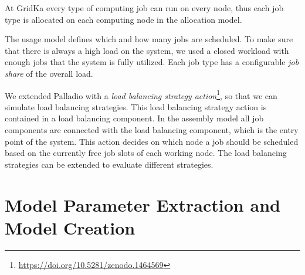 \documentclass{webofc}
\newcommand{\footurl}[1]{\footnote{\url{#1}}}
\begin{document}
At GridKa every type of computing job can run on every node, thus each job type is allocated on each computing node in the allocation model.

The usage model defines which and how many jobs are scheduled. To make sure that there is always a high load on the system, we used a closed workload with enough jobs that the system is fully utilized. Each job type has a configurable \textit{job share} of the overall load.

We extended Palladio with a \textit{load balancing strategy action}\footurl{https://doi.org/10.5281/zenodo.1464569}, so that we can simulate load balancing strategies.
This load balancing strategy action is contained in a load balancing component.
In the assembly model all job components are connected with the load balancing component, which is the entry point of the system.
This action decides on which node a job should be scheduled based on the currently free job slots of each working node. The load balancing strategies can be extended to evaluate different strategies.



\section{Model Parameter Extraction and Model Creation}
\label{sec:param}
\end{document}

